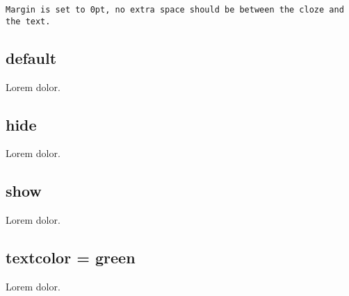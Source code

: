 \documentclass{article}
\begin{document}
{}


\texttt{Margin is set to 0pt, no extra space should be between the cloze
and the text.}

\subsection{default}

Lorem  dolor.

\subsection{hide}

\clozehide

Lorem  dolor.

\subsection{show}

\clozeshow

Lorem  dolor.

\subsection{textcolor = green}


Lorem  dolor.
\end{document}
